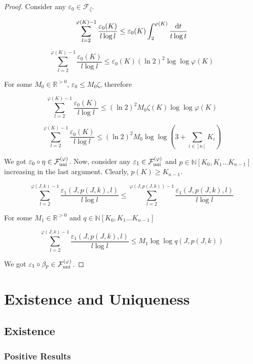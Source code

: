 \documentclass{article}
\numberwithin{equation}{section}
\theoremstyle{definition}
\theoremstyle{plain}
\newcommand{\Nats}{\mathbb{N}}
\newcommand{\Reals}{\mathbb{R}}
\newcommand{\NatPoly}{\Nats[K_0, K_1 \ldots K_{n-1}]}
\newcommand{\Fall}{\mathcal{F}}
\newcommand{\FallUt}[1]{{\Fall_{\textnormal{uni}}^{(#1)}}}
\begin{document}
\begin{proof}

Consider any ${\varepsilon_0 \in \Fall_\zeta}$.

\[\sum_{l=2}^{\varphi(K)-1} \frac{\varepsilon_0(K)}{l \log l} \leq \varepsilon_0(K) \int_2^{\varphi(K)} \frac{\dif t}{t \log t}\]

\[\sum_{l=2}^{\varphi(K)-1} \frac{\varepsilon_0(K)}{l \log l} \leq \varepsilon_0(K) (\ln 2)^2 \log \log \varphi(K)\]

For some ${M_0 \in \Reals^{>0}}$, ${\varepsilon_0 \leq M_0 \zeta}$, therefore

\[\sum_{l=2}^{\varphi(K)-1} \frac{\varepsilon_0(K)}{l \log l} \leq (\ln 2)^2 M_0 \zeta(K) \log \log \varphi(K)\]

\[\sum_{l=2}^{\varphi(K)-1} \frac{\varepsilon_0(K)}{l \log l} \leq (\ln 2)^2 M_0 \log \log (3+\sum_{i \in [n]} K_i)\]

We got ${\varepsilon_0 \circ \eta \in \FallUt{\varphi}}$. Now, consider any ${\varepsilon_1 \in \FallUt{\varphi}}$ and ${p \in \NatPoly}$ increasing in the last argument. Clearly, ${p(K) \geq K_{n-1}}$.

\[\sum_{l=2}^{\varphi(J,k)-1} \frac{\varepsilon_1(J,p(J,k),l)}{l \log l} \leq \sum_{l=2}^{\varphi(J,p(J,k))-1} \frac{\varepsilon_1(J,p(J,k),l)}{l \log l}\]

For some ${M_1 \in \Reals^{>0}}$ and ${q \in \NatPoly}$

\[\sum_{l=2}^{\varphi(J,k)-1} \frac{\varepsilon_1(J,p(J,k),l)}{l \log l} \leq M_1 \log \log q(J,p(J,k))\]

We got ${\varepsilon_1 \circ \beta_p \in \FallUt{\varphi}}$.
%
\end{proof}

\section{Existence and Uniqueness}
\label{sec:e_and_u}

\subsection{Existence}

\subsubsection{Positive Results}
\end{document}
